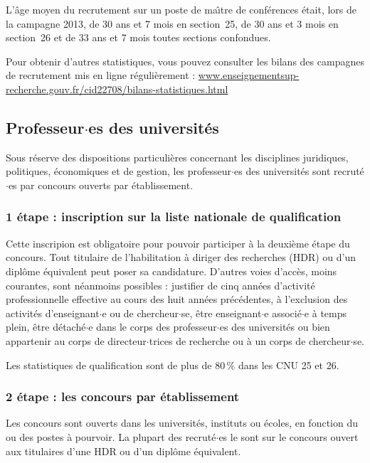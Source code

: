 L'\^age moyen du recrutement sur un poste de ma\^\i  tre de
conf\'erences \'etait, lors de la campagne 2013, 
de 30 ans et 7 mois en section~25, 
de 30 ans et 3 mois en section~26 et 
de 33 ans et 7 mois toutes sections confondues.

Pour obtenir d'autres statistiques, vous pouvez consulter les bilans des
campagnes de recrutement mis en ligne r\'e\-gu\-li\`erement :
{\url{www.enseignementsup-recherche.gouv.fr/cid22708/bilans-statistiques.html}}

\subsection{Professeur$\cdot$es des universit\'es}

Sous r\'eserve des dispositions particuli\`eres concernant les disciplines juridiques, politiques,
\'economiques et de gestion, les professeur$\cdot$es des universit\'es sont recrut\'e$\cdot$es par concours ouverts par \'etablissement.

\subsubsection*{1\iere{} \'etape : inscription sur la liste nationale de qualification}

Cette inscripion est obligatoire pour pouvoir participer \`a la deuxi\`eme \'etape du concours.
Tout titulaire de l'habilitation \`a diriger des recherches (HDR)
ou d'un dipl\^ome \'equivalent peut poser sa candidature.
D'autres voies d'acc\`es, moins courantes, sont n\'eanmoins possibles :
justifier de cinq ann\'ees d'activit\'e professionnelle effective au cours des huit ann\'ees pr\'ec\'edentes,
\`a l'exclusion des activit\'es d'enseignant$\cdot$e ou de chercheur$\cdot$se,
\^etre enseignant$\cdot$e associ\'e$\cdot$e \`a temps plein,
\^etre d\'etach\'e$\cdot$e dans le corps des professeur$\cdot$es des universit\'es
ou bien appartenir au corps de directeur$\cdot$trices de recherche ou \`a un corps de chercheur$\cdot$se.

Les statistiques de qualification sont de plus de 80\,\% dans les CNU 25 et 26.

\subsubsection*{2\ieme{} \'etape : les concours par \'etablissement}

Les concours sont ouverts dans les universit\'es, instituts ou \'ecoles, en fonction du ou des postes \`a pourvoir.
La plupart des recrut\'e$\cdot$es le sont sur le concours ouvert aux titulaires d'une HDR ou d'un dipl\^ome \'equivalent.

